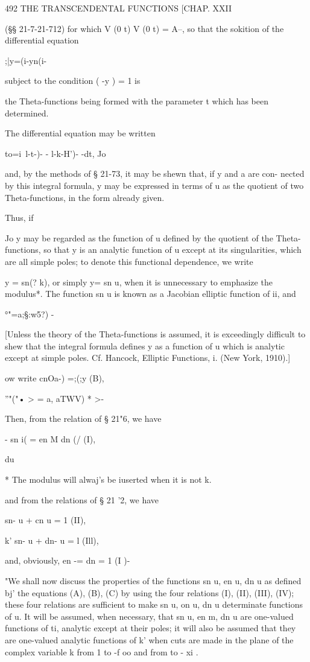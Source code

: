 492 THE TRANSCENDENTAL FUNCTIONS [CHAP. XXII

(§§ 21-7-21-712) for which V (0 t) V (0 t) = A--, so that the sokition
of the differential equation

;|y=(i-yn(i-%

subject to the condition ( -y ) = 1 is

the Theta-functions being formed with the parameter t which has been
determined.

The differential equation may be written

to=i\ l-t-)- - l-k-H')- -dt, Jo

and, by the methods of § 21-73, it may be shewn that, if y and a are
con- nected by this integral formula, y may be expressed in terms of u
as the quotient of two Theta-functions, in the form already given.

Thus, if

Jo y may be regarded as the function of u defined by the quotient of
the Theta- functions, so that y is an analytic function of u except at
its singularities, which are all simple poles; to denote this
functional dependence, we write

y = sn(? k), or simply y= sn u, when it is unnecessary to emphasize
the modulus*. The function sn u is known as a Jacobian elliptic
function of ii, and

 °"=a;§:w5?) -

[Unless the theory of the Theta-functions is assumed, it is
exceedingly difficult to shew that the integral formula defines y as a
function of u which is analytic except at simple poles. Cf. Hancock,
Elliptic Functions, i. (New York, 1910).]

 ow write cnOa-) =;(;y (B),

''"("• > = a, aTWV) * >-

Then, from the relation of § 21"6, we have

 - sn i( = en M dn (/ (I),

du

* The modulus will alwaj's be iuserted when it is not k.

%
%

and from the relations of § 21 '2, we have

sn- u + cn u = 1 (II),

k' sn- u + dn- u = l (Ill),

and, obviously, en -= dn = 1 (I )-

"We shall now discuss the properties of the functions sn u, en u, dn u
as defined bj' the equations (A), (B), (C) by using the four relations
(I), (II), (III), (IV); these four relations are sufficient to make
sn u, on u, dn u determinate functions of u. It will be assumed, when
necessary, that sn u, en m, dn u are one-valued functions of ti,
analytic except at their poles; it will also be assumed that they are
one-valued analytic functions of k' when cuts are made in the plane of
the complex variable k from 1 to -f oo and from to - xi .

